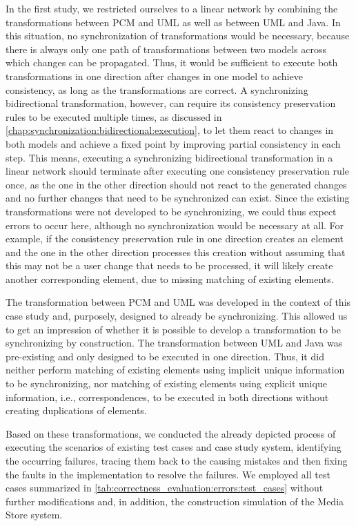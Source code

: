 In the first study, we restricted ourselves to a linear network by combining the transformations between \gls{PCM} and \gls{UML} as well as between \gls{UML} and Java.
In this situation, no synchronization of transformations would be necessary, because there is always only one path of transformations between two models across which changes can be propagated.
Thus, it would be sufficient to execute both transformations in one direction after changes in one model to achieve consistency, as long as the transformations are correct.
A synchronizing bidirectional transformation, however, can require its consistency preservation rules to be executed multiple times, as discussed in \autoref{chap:synchronization:bidirectional:execution}, to let them react to changes in both models and achieve a fixed point by improving partial consistency in each step.
This means, executing a synchronizing bidirectional transformation in a linear network should terminate after executing one consistency preservation rule once, as the one in the other direction should not react to the generated changes and no further changes that need to be synchronized can exist.
Since the existing transformations were not developed to be synchronizing, we could thus expect errors to occur here, although no synchronization would be necessary at all.
For example, if the consistency preservation rule in one direction creates an element and the one in the other direction processes this creation without assuming that this may not be a user change that needs to be processed, it will likely create another corresponding element, due to missing matching of existing elements.

The transformation between \gls{PCM} and \gls{UML} was developed in the context of this case study and, purposely, designed to already be synchronizing.
This allowed us to get an impression of whether it is possible to develop a transformation to be synchronizing by construction.
The transformation between \gls{UML} and Java was pre-existing and only designed to be executed in one direction.
Thus, it did neither perform matching of existing elements using implicit unique information to be synchronizing, nor matching of existing elements using explicit unique information, i.e., correspondences, to be executed in both directions without creating duplications of elements.

Based on these transformations, we conducted the already depicted process of executing the scenarios of existing test cases and case study system, identifying the occurring failures, tracing them back to the causing mistakes and then fixing the faults in the implementation to resolve the failures.
We employed all test cases summarized in \autoref{tab:correctness_evaluation:errors:test_cases} without further modifications and, in addition, the construction simulation of the Media Store system.


